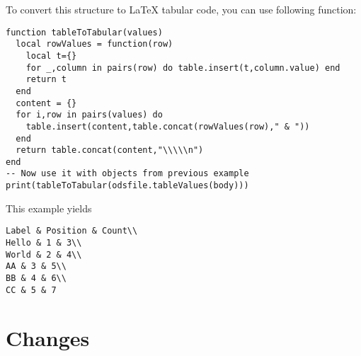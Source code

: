 \documentclass{ltxdoc}
\begin{document}
To convert this structure to \LaTeX{} tabular code, you can use following function:

\begin{verbatim}
function tableToTabular(values)
  local rowValues = function(row)
    local t={} 
    for _,column in pairs(row) do table.insert(t,column.value) end
    return t
  end
  content = {}   
  for i,row in pairs(values) do
    table.insert(content,table.concat(rowValues(row)," & "))
  end
  return table.concat(content,"\\\\\n")
end
-- Now use it with objects from previous example
print(tableToTabular(odsfile.tableValues(body)))
\end{verbatim}  

This example yields

\begin{verbatim}
Label & Position & Count\\
Hello & 1 & 3\\
World & 2 & 4\\
AA & 3 & 5\\
BB & 4 & 6\\
CC & 5 & 7
\end{verbatim}



\section{Changes}
\end{document}
